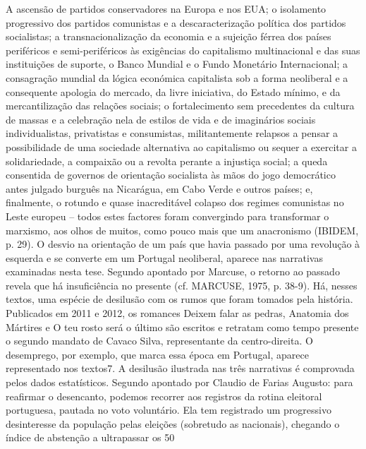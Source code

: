 \documentclass[../DISSERTACAO_MAIN.tex]{subfiles}
\begin{document}
A ascensão de partidos conservadores na Europa e nos EUA; o isolamento progressivo dos partidos comunistas e a descaracterização política dos partidos socialistas; a transnacionalização da economia e a sujeição férrea dos países periféricos e semi-periféricos às exigências do capitalismo multinacional e das suas instituições de suporte, o Banco Mundial e o Fundo Monetário Internacional; a consagração mundial da lógica económica capitalista sob a forma neoliberal e a consequente apologia do mercado, da livre iniciativa, do Estado mínimo, e da mercantilização das relações sociais; o fortalecimento sem precedentes da cultura de massas e a celebração nela de estilos de vida e de imaginários sociais individualistas, privatistas e consumistas, militantemente relapsos a pensar a possibilidade de uma sociedade alternativa ao capitalismo ou sequer a exercitar a solidariedade, a compaixão ou a revolta perante a injustiça social;  a queda consentida de governos de orientação socialista às mãos do jogo democrático antes julgado burguês na Nicarágua, em Cabo Verde e outros países; e, finalmente, o rotundo e quase inacreditável colapso dos regimes comunistas no Leste europeu – todos estes factores foram convergindo para transformar o marxismo, aos olhos de muitos, como pouco mais que um anacronismo (IBIDEM, p. 29). 
O desvio na orientação de um país que havia passado por uma revolução à esquerda e se converte em um Portugal neoliberal, aparece nas narrativas examinadas nesta tese. Segundo apontado por Marcuse, o retorno ao passado revela que há insuficiência no presente (cf. MARCUSE, 1975, p. 38-9). Há, nesses textos, uma espécie de desilusão com os rumos que foram tomados pela história. Publicados em 2011 e 2012, os romances Deixem falar as pedras, Anatomia dos Mártires e O teu rosto será o último são escritos e retratam como tempo presente o segundo mandato de Cavaco Silva, representante da centro-direita. O desemprego, por exemplo, que marca essa época em Portugal, aparece representado nos textos7. A desilusão ilustrada nas três narrativas é comprovada pelos dados estatísticos. Segundo apontado por Claudio de Farias Augusto:
para reafirmar o desencanto, podemos recorrer aos registros da rotina eleitoral portuguesa, pautada no voto voluntário. Ela tem registrado um progressivo desinteresse da população pelas eleições (sobretudo as nacionais), chegando o índice de abstenção a ultrapassar os 50%
\end{document}

